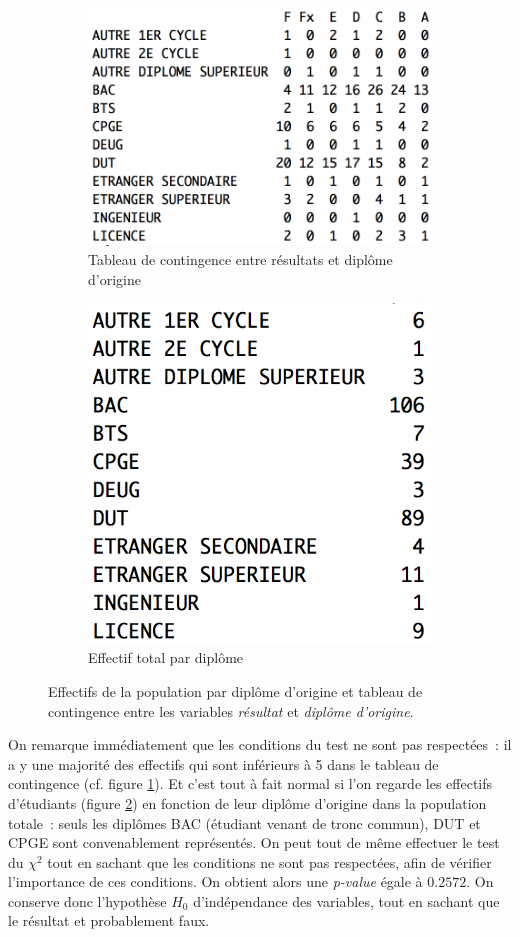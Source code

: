 \documentclass[a4paper,12pt]{report}
\begin{document}
\begin{figure}[h]
	\centering
	\captionsetup{justification=centering, margin=2cm}
	\begin{subfigure}[b]{0.5\linewidth}
		\centering
		\captionsetup{justification=centering, margin=1cm}
		\includegraphics[width=0.65\linewidth]{img/1-1-2-Contingence-Result-Diplome-Origine}
		\caption{\scriptsize Tableau de contingence entre résultats et diplôme d'origine}
		\label{fig:tab_contingence_diplome_resultat}
	\end{subfigure}%
	\begin{subfigure}[b]{0.5\linewidth}
		\centering
		\captionsetup{justification=centering, margin=1cm}
		\includegraphics[width=0.5\linewidth]{img/1-1-2-Effectif-Diplome-Origine}
		\caption{\scriptsize Effectif total par diplôme}
		\label{fig:effectif_total_par_diplome}
	\end{subfigure}%
	\caption{
		\small Effectifs de la population par diplôme d'origine et tableau de contingence entre les variables \textit{résultat} et \textit{diplôme d'origine}.
	}
	\label{fig:tab_effectifs_et_contingence_resultats_diplome_origine}%
\end{figure}

On remarque immédiatement que les conditions du test ne sont pas respectées~: il a y une majorité des effectifs qui sont inférieurs à 5 dans le tableau de contingence  (cf. figure \ref{fig:tab_contingence_diplome_resultat}). Et c'est tout à fait normal si l'on regarde les effectifs d'étudiants (figure \ref{fig:effectif_total_par_diplome}) en fonction de leur diplôme d'origine dans la population totale~: seuls les diplômes BAC (étudiant venant de tronc commun), DUT et CPGE sont convenablement représentés.
On peut tout de même effectuer le test du $\chi^2$ tout en sachant que les conditions ne sont pas respectées, afin de vérifier l'importance de ces conditions. On obtient alors une \textit{p-value} égale à $0.2572$. On conserve donc l'hypothèse $H_{0}$ d'indépendance des variables, tout en sachant que le résultat et probablement faux.
\end{document}
